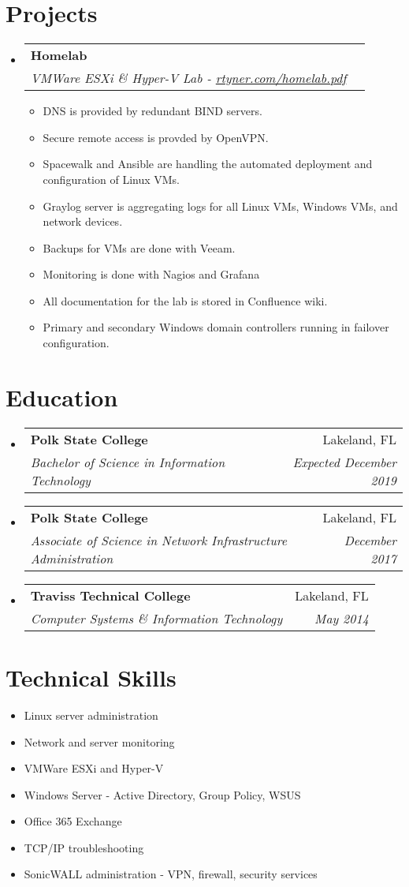 \documentclass[letterpaper,11pt]{article}
\makeatletter
\newcommand{\resumeItem}[2]{
  \item\small{
    \textbf{}{#2 \vspace{-2pt}}
  }
}
\newcommand{\resumeSubheading}[4]{
  \vspace{-1pt}\item
    \begin{tabular*}{0.97\textwidth}{l@{\extracolsep{\fill}}r}
      \textbf{#1} & #2 \\
      \textit{\small#3} & \textit{\small #4} \\
    \end{tabular*}\vspace{-5pt}
}
\newcommand{\resumeSubItem}[2]{\resumeItem{#1}{#2}\vspace{-4pt}}
\newcommand{\resumeSubHeadingListStart}{\begin{itemize}[leftmargin=*]}
\newcommand{\resumeSubHeadingListEnd}{\end{itemize}}
\newcommand{\resumeItemListStart}{\begin{itemize}}
\newcommand{\resumeItemListEnd}{\end{itemize}\vspace{-5pt}}
\makeatother
\begin{document}
\section{Projects}
  \resumeSubHeadingListStart
    \resumeSubheading
      {Homelab}{}
      {VMWare ESXi \& Hyper-V Lab - \href{https://rtyner.com/homelab.pdf}{rtyner.com/homelab.pdf}}{}
      \resumeItemListStart
        \resumeItem{}
          {DNS is provided by redundant BIND servers.}
        \resumeItem{}
          {Secure remote access is provded by OpenVPN.}
        \resumeItem{}
          {Spacewalk and Ansible are handling the automated deployment and configuration of Linux VMs.}
        \resumeItem{}
          {Graylog server is aggregating logs for all Linux VMs, Windows VMs, and network devices.}
        \resumeItem{}
          {Backups for VMs are done with Veeam.}
        \resumeItem{}
          {Monitoring is done with Nagios and Grafana}
        \resumeItem{}
          {All documentation for the lab is stored in Confluence wiki.}
        \resumeItem{}
          {Primary and secondary Windows domain controllers running in failover configuration.}
      \resumeItemListEnd
  \resumeSubHeadingListEnd
\section{Education}
  \resumeSubHeadingListStart
    \resumeSubheading
      {Polk State College}{Lakeland, FL}
      {Bachelor of Science in Information Technology}{Expected December 2019}
    \resumeSubheading
      {Polk State College}{Lakeland, FL}
      {Associate of Science in Network Infrastructure Administration}{December 2017}
    \resumeSubheading
      {Traviss Technical College}{Lakeland, FL}
      {Computer Systems \& Information Technology}{May 2014}
  \resumeSubHeadingListEnd

\section{Technical Skills}
  \resumeSubHeadingListStart
    \resumeSubItem{}
      {Linux server administration}
    \resumeSubItem{}
      {Network and server monitoring}
    \resumeSubItem{}
      {VMWare ESXi and Hyper-V}    
    \resumeSubItem{}
      {Windows Server - Active Directory, Group Policy, WSUS}
    \resumeSubItem{}
      {Office 365 Exchange}
    \resumeSubItem{}
      {TCP/IP troubleshooting}
    \resumeSubItem{}
      {SonicWALL administration - VPN, firewall, security services}
  \resumeSubHeadingListEnd
\end{document}
